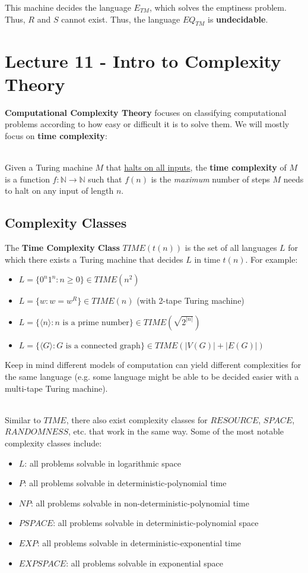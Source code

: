 \documentclass[12pt]{article}
\begin{document}
\noindent
This machine decides the language $E_{TM}$, which solves the emptiness problem.
Thus, $R$ and $S$ cannot exist.
Thus, the language $EQ_{TM}$ is \textbf{undecidable}.

%
%
\newpage
\section*{Lecture 11 - Intro to Complexity Theory}
\textbf{Computational Complexity Theory} focuses on classifying computational problems according to how easy or difficult it is to solve them.
We will mostly focus on \textbf{time complexity}:

\noindent
\\
Given a Turing machine $M$ that \underline{halts on all inputs}, the \textbf{time complexity} of $M$ is a function $f: \mathbb{N} \rightarrow \mathbb{N}$ such that $f(n)$ is the \textit{maximum} number of steps $M$ needs to halt on any input of length $n$.

\subsection*{Complexity Classes}
The \textbf{Time Complexity Class} $TIME(t(n))$ is the set of all languages $L$ for which there exists a Turing machine that decides $L$ in time $t(n)$.
For example:

\begin{itemize}
    \item $L = \{0^n 1^n : n \geq 0\} \in TIME(n^2)$
    \item $L = \{w : w = w^R\} \in TIME(n)$ (with 2-tape Turing machine)
    \item $L = \{\langle n \rangle : n \text{ is a prime number}\} \in TIME(\sqrt{2^{|n|}})$
    \item $L = \{\langle G \rangle : G \text{ is a connected graph}\} \in TIME(|V(G)| + |E(G)|)$
\end{itemize}

\noindent
Keep in mind different models of computation can yield different complexities for the same language (e.g. some language might be able to be decided easier with a multi-tape Turing machine).

\noindent
\\
Similar to $TIME$, there also exist complexity classes for $RESOURCE$, $SPACE$, $RANDOMNESS$, etc. that work in the same way.
Some of the most notable complexity classes include:

\begin{itemize}
    \item $L$: all problems solvable in logarithmic space
    \item $P$: all problems solvable in deterministic-polynomial time
    \item $NP$: all problems solvable in non-deterministic-polynomial time
    \item $PSPACE$: all problems solvable in deterministic-polynomial space
    \item $EXP$: all problems solvable in deterministic-exponential time
    \item $EXPSPACE$: all problems solvable in exponential space    
\end{itemize}
\end{document}
